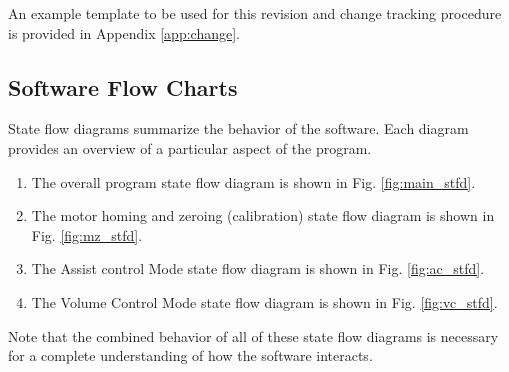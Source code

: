 \documentclass[]{article}
\begin{document}
\noindent An example template to be used for this revision and change tracking procedure is provided in Appendix \ref{app:change}.


\clearpage


\begin{appendices}
	
	



\section{Software Flow Charts}
\label{app:sfd}

State flow diagrams summarize the behavior of the software.  Each diagram provides an overview of a particular aspect of the program.
\begin{enumerate}
	\item The overall program state flow diagram is shown in Fig. \ref{fig:main_stfd}.
	\item The motor homing and zeroing (calibration) state flow diagram is shown in Fig. \ref{fig:mz_stfd}.
	\item The Assist control Mode state flow diagram is shown in Fig. \ref{fig:ac_stfd}.
	\item The Volume Control Mode state flow diagram is shown in Fig. \ref{fig:vc_stfd}.
\end{enumerate}

Note that the combined behavior of all of these state flow diagrams is necessary for a complete understanding of how the software interacts.


\end{appendices}
\end{document}
